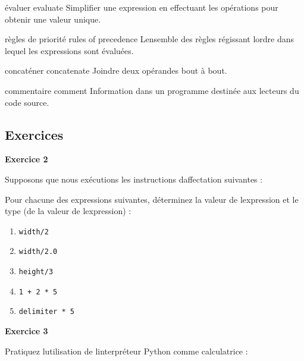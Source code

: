 évaluer evaluate Simplifier une expression en effectuant les opérations
pour obtenir une valeur unique.

règles de priorité rules of precedence L\textquotesingle ensemble des
règles régissant l\textquotesingle ordre dans lequel les expressions
sont évaluées.

concaténer concatenate Joindre deux opérandes bout à bout.

commentaire comment Information dans un programme destinée aux lecteurs
du code source.

\hypertarget{exercices}{%
\subsection{Exercices}\label{exercices}}

\textbf{Exercice 2}

Supposons que nous exécutions les instructions
d\textquotesingle affectation suivantes :

\begin{Shaded}
\begin{Highlighting}[]
\OperatorTok{=} 
\OperatorTok{=} 
\OperatorTok{=} 
\end{Highlighting}
\end{Shaded}

Pour chacune des expressions suivantes, déterminez la valeur de
l\textquotesingle expression et le type (de la valeur de
l\textquotesingle expression) :

\begin{enumerate}
\def\labelenumi{\arabic{enumi}.}
\tightlist
\item
  \texttt{width/2}
\item
  \texttt{width/2.0}
\item
  \texttt{height/3}
\item
  \texttt{1\ +\ 2\ *\ 5}
\item
  \texttt{delimiter\ *\ 5}
\end{enumerate}

\textbf{Exercice 3}

Pratiquez l\textquotesingle utilisation de
l\textquotesingle interpréteur Python comme calculatrice :

